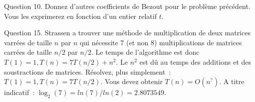 \documentclass[a4paper]{article}
\begin{document}
Question 10. Donnez d'autres coefficients de Bezout pour le problème précédent. Vous les exprimerez en fonction d'un entier relatif $t$.










Question  15. Strassen a trouver une méthode de multiplication de deux matrices varrées de taille $n$ par $n$ qui nécessite
7 (et non 8) multiplications de matrices carrées de taille $n/2$ par $n/2$. Le temps de l'algorithme est donc
$T(1)=1, T(n)=7T(n/2)+n^2$. Le $n^2$ est dû au temps des additions et des soustractions de matrices. Résolvez, plus simplement~:
$T(1)=1, T(n)=7T(n/2)$. Vous devez obtenir $T(n)=O(n^?)$. A titre indicatif~: $\log_2(7)=ln(7)/ln(2)= 2.8073549$. 
\end{document}
